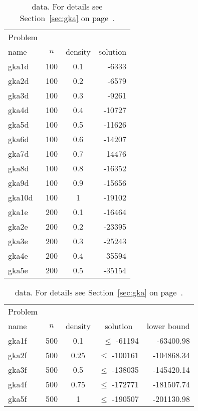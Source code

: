 \documentclass[a4paper, 12pt]{article}
\begin{document}
\begin{table} \begin{center}
\begin{tabular}{|l|cc|r|}
\hline
Problem     &         &          & \\
name & $n$ & density &\multicolumn{1}{|c|}{solution}\\
\hline
gka1d  & 100 & 0.1 &  -6333  \\
gka2d  & 100 & 0.2 &  -6579  \\
gka3d  & 100 & 0.3 &  -9261  \\
gka4d  & 100 & 0.4 & -10727  \\
gka5d  & 100 & 0.5 & -11626  \\
gka6d  & 100 & 0.6 & -14207  \\
gka7d  & 100 & 0.7 & -14476  \\
gka8d  & 100 & 0.8 & -16352  \\
gka9d  & 100 & 0.9 & -15656  \\
gka10d & 100 & 1   & -19102  \\
\hline
gka1e & 200 & 0.1 & -16464  \\
gka2e & 200 & 0.2 & -23395  \\
gka3e & 200 & 0.3 & -25243  \\
gka4e & 200 & 0.4 & -35594  \\
gka5e & 200 & 0.5 & -35154  \\
\hline
\end{tabular}

\medskip
\begin{tabular}{|l|cc|r|r|}
\hline
Problem &  &         & &\\
name & $n$ & density &\multicolumn{1}{|c|}{solution}&\multicolumn{1}{|c|}{lower bound}\\
\hline
gka1f & 500 & 0.1  & $\le$ -61194  & -63400.98 \\
gka2f & 500 & 0.25 & $\le$ -100161 & -104868.34 \\
gka3f & 500 & 0.5  & $\le$ -138035 & -145420.14 \\
gka4f & 500 & 0.75 & $\le$ -172771 & -181507.74 \\
gka5f & 500 & 1    & $\le$ -190507 & -201130.98 \\
\hline
\end{tabular}
\caption{\cite{GlKoAl:98} data. For details see Section~\ref{sec:gka}
  on page~\pageref{sec:gka}.} \label{tab:gka2} 
\end{center} \end{table}
\end{document}
